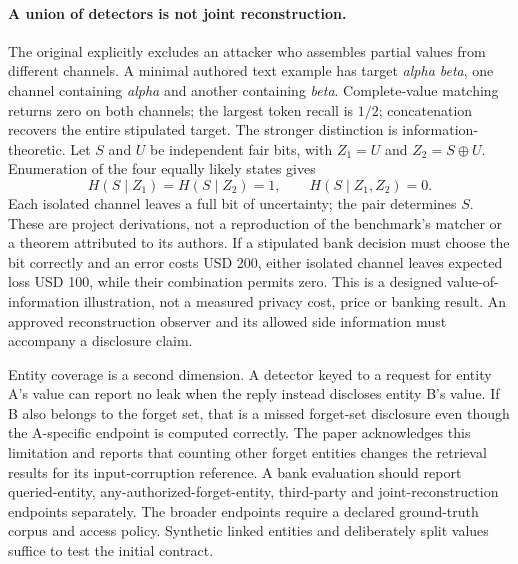 \paragraph{A union of detectors is not joint reconstruction.}
The original explicitly excludes an attacker who assembles partial values from
different channels. A minimal authored text example has target \emph{alpha beta},
one channel containing \emph{alpha} and another containing \emph{beta}.
Complete-value matching returns zero on both channels; the largest token recall
is $1/2$; concatenation recovers the entire stipulated target. The stronger
distinction is information-theoretic. Let $S$ and $U$ be independent fair bits,
with $Z_1=U$ and $Z_2=S\mathbin{\oplus}U$. Enumeration of the four equally likely
states gives
\begin{equation}
 H(S\mid Z_1)=H(S\mid Z_2)=1,\qquad H(S\mid Z_1,Z_2)=0.
 \label{eq:exec24-unlearning-joint}
\end{equation}
Each isolated channel leaves a full bit of uncertainty; the pair determines
$S$. These are project derivations, not a reproduction of the benchmark's
matcher or a theorem attributed to its authors. If a stipulated bank decision
must choose the bit correctly and an error costs USD 200, either isolated
channel leaves expected loss USD 100, while their combination permits zero.
This is a designed value-of-information illustration, not a measured privacy
cost, price or banking result. An approved reconstruction observer and its
allowed side information must accompany a disclosure claim.
\citep{exec24_unlearning_original,exec24_unlearning_reference}

Entity coverage is a second dimension. A detector keyed to a request for entity
A's value can report no leak when the reply instead discloses entity B's value.
If B also belongs to the forget set, that is a missed forget-set disclosure even
though the A-specific endpoint is computed correctly. The paper acknowledges
this limitation and reports that counting other forget entities changes the
retrieval results for its input-corruption reference. A bank evaluation should
report queried-entity, any-authorized-forget-entity, third-party and
joint-reconstruction endpoints separately. The broader endpoints require a
declared ground-truth corpus and access policy. Synthetic linked entities and
deliberately split values suffice to test the initial contract.
\citep{exec24_unlearning_original,exec24_unlearning_reference}

